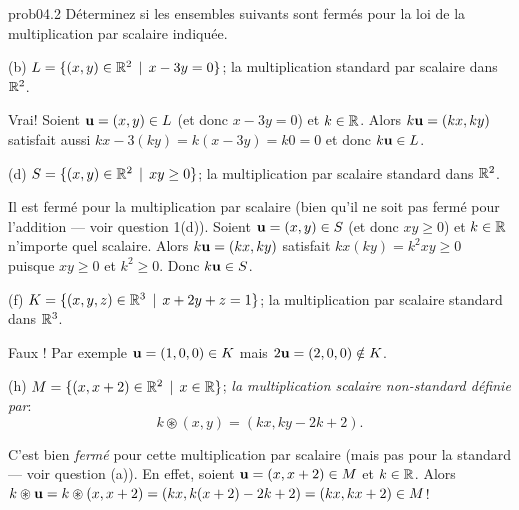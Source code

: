 \bigskip
\begin{sol}{prob04.2} Déterminez si les
ensembles suivants sont fermés pour la loi de la multiplication par scalaire indiquée.

\medskip
(b) $L=\{(x, y) \in \mathbb{R}^2\, \mid \, x -3y=0 \}$; la multiplication standard par scalaire dans $\mathbb{R}^2$.

\soln Vrai! Soient
$\mathbf{u}=(x,y)\in L$ (et donc $x -3y=0$) et $k\in \mathbb{R}$. Alors $k \mathbf{u}= (kx, ky)$ satisfait aussi $kx-3(ky)=k(x-3y)=k0=0$
et donc $k\mathbf{u}\in L$. 

\medskip
(d) $S=\{(x, y) \in \mathbb{R}^2\, \mid \, xy \ge 0 \}$; la multiplication par scalaire standard dans $\mathbb{R}^2$.

\soln Il est fermé pour la multiplication par scalaire (bien qu'il ne soit
pas fermé pour l'addition --- voir question 1(d)). Soient $\mathbf{u}=(x,y)\in S$ (et donc
$xy \ge 0$) et $k\in \mathbb{R}$ n'importe quel scalaire. Alors
$k \mathbf{u}= (kx, ky)$ satisfait $kx(ky)=k^2 xy \ge 0$ puisque $xy \ge 0$
et $k^2\ge 0$. Donc $k\mathbf{u}\in S$. 

\medskip
(f) $K=\{(x, y, z) \in \mathbb{R}^3\, \mid \, x+2y+z=1 \}$; la multiplication par scalaire standard dans $\mathbb{R}^3$.

\soln Faux ! Par exemple
$\mathbf{u}=(1,0,0)\in K$ mais $2\mathbf{u} =(2,0,0)\notin K$. 

\medskip
(h) $M=\{(x, x+2) \in \mathbb{R}^2\, \mid \, x\in \mathbb{R}\}$; {\emph{la multiplication scalaire non-standard définie par}}:
\[k\circledast (x,y)=(kx, ky-2k+2).\]

\soln C'est bien {\emph{fermé}}  pour cette multiplication par scalaire (mais pas pour la standard --- voir
question (a)). En effet, soient $\mathbf{u}=(x, x+2)\in M$ et $k\in \mathbb{R}$. Alors
$k\circledast \mathbf{u} =k\circledast (x,x+2)= (kx, k(x+2)-2k+2)=(kx, kx+2) \in M$!
 
\end{sol}
\medskip

